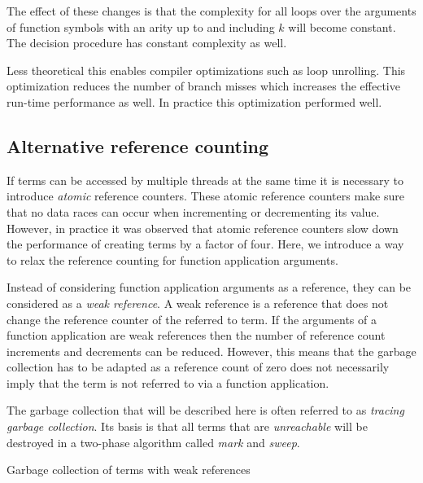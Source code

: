 \documentclass[10pt,a4paper]{article}
\begin{document}
The effect of these changes is that the complexity for all loops over the arguments of function symbols with an arity up to and including $k$ will become constant. 
The decision procedure has constant complexity as well.

Less theoretical this enables compiler optimizations such as loop unrolling. 
This optimization reduces the number of branch misses which increases the effective run-time performance as well.
In practice this optimization performed well.

\subsection{Alternative reference counting}

If terms can be accessed by multiple threads at the same time it is necessary to introduce \emph{atomic} reference counters.
These atomic reference counters make sure that no data races can occur when incrementing or decrementing its value.
However, in practice it was observed that atomic reference counters slow down the performance of creating terms by a factor of four.
Here, we introduce a way to relax the reference counting for function application arguments.

Instead of considering function application arguments as a reference, they can be considered as a \emph{weak reference}.
A weak reference is a reference that does not change the reference counter of the referred to term.
If the arguments of a function application are weak references then the number of reference count increments and decrements can be reduced.
However, this means that the garbage collection has to be adapted as a reference count of zero does not necessarily imply that the term is not referred to via a function application.

The garbage collection that will be described here is often referred to as \emph{tracing garbage collection}. 
Its basis is that all terms that are \emph{unreachable} will be destroyed in a two-phase algorithm called \emph{mark} and \emph{sweep}.

\begin{algorithm}[H]
  \caption{Garbage collection of terms with weak references}\label{alg:collect}
  \begin{algorithmic}[1]
    \EndProcedure
  \end{algorithmic}
\end{algorithm}
\end{document}
